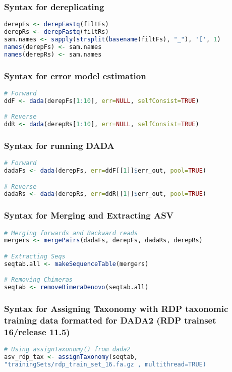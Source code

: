 \subsubsection*{Syntax for dereplicating}

\begin{lstlisting}[language=R]
derepFs <- derepFastq(filtFs)
derepRs <- derepFastq(filtRs)
sam.names <- sapply(strsplit(basename(filtFs), "_"), '[', 1)
names(derepFs) <- sam.names
names(derepRs) <- sam.names
\end{lstlisting}

\subsubsection*{Syntax for error model estimation}

\begin{lstlisting}[language=R]
# Forward
ddF <- dada(derepFs[1:10], err=NULL, selfConsist=TRUE)

# Reverse
ddR <- dada(derepRs[1:10], err=NULL, selfConsist=TRUE)
\end{lstlisting}

\subsubsection*{Syntax for running DADA}

\begin{lstlisting}[language=R]
# Forward
dadaFs <- dada(derepFs, err=ddF[[1]]$err_out, pool=TRUE)

# Reverse
dadaRs <- dada(derepRs, err=ddR[[1]]$err_out, pool=TRUE)
\end{lstlisting}

\subsubsection*{Syntax for Merging and Extracting ASV}

\begin{lstlisting}[language=R]
# Merging forwards and Backward reads
mergers <- mergePairs(dadaFs, derepFs, dadaRs, derepRs)

# Extracting Seqs
seqtab.all <- makeSequenceTable(mergers)

# Removing Chimeras
seqtab <- removeBimeraDenovo(seqtab.all)
\end{lstlisting}

\subsubsection*{Syntax for Assigning Taxonomy with RDP taxonomic training data formatted for DADA2 (RDP trainset 16/release 11.5)}

\begin{lstlisting}[language=R]
# Using assignTaxonomy() from dada2
asv_rdp_tax <- assignTaxonomy(seqtab,
"trainingSets/rdp_train_set_16.fa.gz , multithread=TRUE)
\end{lstlisting}